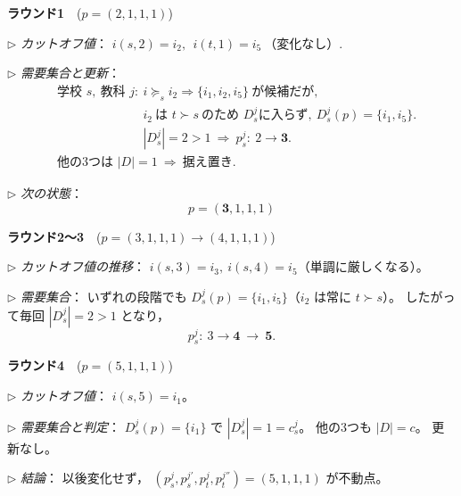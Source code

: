 \documentclass[12pt, a4paper]{article}
\theoremstyle{definition}
\theoremstyle{remark}
\theoremstyle{plain}
\begin{document}
\medskip
\noindent\textbf{ラウンド1}\ \ (\(p=(2,1,1,1)\))
\medskip

\noindent\(\triangleright\) \textit{カットオフ値}：
\(i(s,2)=i_2,\ \ i(t,1)=i_5\ \text{（変化なし）}\).

\noindent\(\triangleright\) \textit{需要集合と更新}：
\[
\begin{aligned}
&\text{学校 }s,\ \text{教科 }j:\ i\succeq_s i_2 \Rightarrow \{i_1,i_2,i_5\}\ \text{が候補だが},\\
&\phantom{\text{学校 }s,\ \text{教科 }j:}\ i_2\ \text{は }t\succ s\ \text{のため }D^j_s\text{に入らず},\ D^j_s(p)=\{i_1,i_5\}.\\
&\phantom{\text{学校 }s,\ \text{教科 }j:}\ |D^j_s|=2>1\ \Rightarrow\ p^j_s:\ 2\to \mathbf{3}.\\
&\text{他の3つは }|D|=1\ \Rightarrow\ \text{据え置き}.
\end{aligned}
\]

\noindent\(\triangleright\) \textit{次の状態}：
\[
p=(\mathbf{3},1,1,1)
\]

\medskip
\noindent\textbf{ラウンド2～3}\ \ (\(p=(3,1,1,1)\to(4,1,1,1)\))
\medskip

\noindent\(\triangleright\) \textit{カットオフ値の推移}：
\(i(s,3)=i_3,\ i(s,4)=i_5\)（単調に厳しくなる）。

\noindent\(\triangleright\) \textit{需要集合}：
いずれの段階でも
\(D^j_s(p)=\{i_1,i_5\}\)（\(i_2\) は常に \(t\succ s\)）。
したがって毎回 \(|D^j_s|=2>1\) となり，
\[
p^j_s:\ 3\to \mathbf{4}\ \to\ \mathbf{5}.
\]

\medskip
\noindent\textbf{ラウンド4}\ \ (\(p=(5,1,1,1)\))
\medskip

\noindent\(\triangleright\) \textit{カットオフ値}：
\(i(s,5)=i_1\)。

\noindent\(\triangleright\) \textit{需要集合と判定}：
\(D^j_s(p)=\{i_1\}\) で \(|D^j_s|=1=c^j_s\)。
他の3つも \(|D|=c\)。
更新なし。

\noindent\(\triangleright\) \textit{結論}：
以後変化せず，
\(\boxed{(p^j_s,p^{j'}_s,p^j_t,p^{j''}_t)=(5,1,1,1)}\) が不動点。
\end{document}
